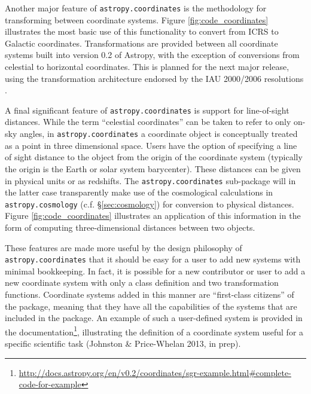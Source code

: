 \documentclass[traditabstract]{aa}
\begin{document}
Another major feature of \texttt{astropy.coordinates} is the methodology for
transforming between coordinate systems. Figure \ref{fig:code_coordinates}
illustrates the most basic use of this functionality to convert from ICRS to
Galactic coordinates. Transformations are provided between all coordinate
systems built into version 0.2 of Astropy, with the exception of conversions
from celestial to horizontal coordinates. This is planned for the next major
release, using the transformation architecture endorsed by the IAU 2000/2006
resolutions \citep[see e.g.,][]{soffel03, usnocircular179}.

A final significant feature of \texttt{astropy.coordinates} is support for
line-of-sight distances. While the term ``celestial coordinates'' can be taken
to refer to only on-sky angles, in \texttt{astropy.coordinates} a coordinate
object is conceptually treated as a point in three dimensional space. Users
have the option of specifying a line of sight distance to the object from the
origin of the coordinate system (typically the origin is the Earth or solar
system barycenter). These distances can be given in physical units or as
redshifts. The \texttt{astropy.coordinates} sub-package will in the latter case
transparently make use of the cosmological calculations in
\texttt{astropy.cosmology} (c.f. \S\ref{sec:cosmology}) for conversion to
physical distances. Figure \ref{fig:code_coordinates} illustrates an
application of this information in the form of computing three-dimensional
distances between two objects.

These features are made more useful by the design philosophy of
\texttt{astropy.coordinates} that it should be easy for a user to add new
systems with minimal bookkeeping. In fact, it is possible for a new contributor
or user to add a new coordinate system with only a class definition and two
transformation functions. Coordinate systems added in this manner are
``first-class citizens'' of the package, meaning that they have all the
capabilities of the systems that are included in the package. An example of
such a user-defined system is provided in the
documentation\footnote{\url{http://docs.astropy.org/en/v0.2/coordinates/sgr-example.html#complete-code-for-example}},
illustrating the definition of a coordinate system useful for a specific
scientific task (Johnston \& Price-Whelan 2013, in prep).

\end{document}
